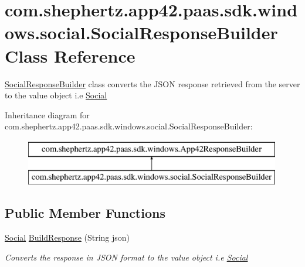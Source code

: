 \hypertarget{classcom_1_1shephertz_1_1app42_1_1paas_1_1sdk_1_1windows_1_1social_1_1_social_response_builder}{\section{com.\+shephertz.\+app42.\+paas.\+sdk.\+windows.\+social.\+Social\+Response\+Builder Class Reference}
\label{classcom_1_1shephertz_1_1app42_1_1paas_1_1sdk_1_1windows_1_1social_1_1_social_response_builder}
}


\hyperlink{classcom_1_1shephertz_1_1app42_1_1paas_1_1sdk_1_1windows_1_1social_1_1_social_response_builder}{Social\+Response\+Builder} class converts the J\+S\+O\+N response retrieved from the server to the value object i.\+e \hyperlink{classcom_1_1shephertz_1_1app42_1_1paas_1_1sdk_1_1windows_1_1social_1_1_social}{Social}  


Inheritance diagram for com.\+shephertz.\+app42.\+paas.\+sdk.\+windows.\+social.\+Social\+Response\+Builder\+:\begin{figure}[H]
\begin{center}
\leavevmode
\includegraphics[height=2.000000cm]{classcom_1_1shephertz_1_1app42_1_1paas_1_1sdk_1_1windows_1_1social_1_1_social_response_builder}
\end{center}
\end{figure}
\subsection*{Public Member Functions}
\begin{DoxyCompactItemize}
\item 
\hyperlink{classcom_1_1shephertz_1_1app42_1_1paas_1_1sdk_1_1windows_1_1social_1_1_social}{Social} \hyperlink{classcom_1_1shephertz_1_1app42_1_1paas_1_1sdk_1_1windows_1_1social_1_1_social_response_builder_acd51241f267c60952e47af388ee80a6e}{Build\+Response} (String json)
\begin{DoxyCompactList}\small\item\em Converts the response in J\+S\+O\+N format to the value object i.\+e \hyperlink{classcom_1_1shephertz_1_1app42_1_1paas_1_1sdk_1_1windows_1_1social_1_1_social}{Social} \end{DoxyCompactList}\end{DoxyCompactItemize}


